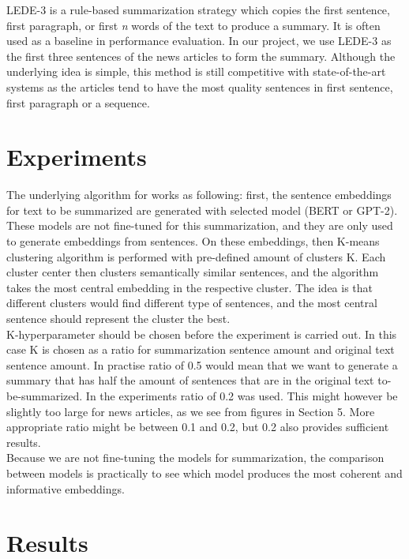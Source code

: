 \documentclass{article}
\begin{document}
LEDE-3 is a rule-based summarization strategy which copies the first sentence, first paragraph, or first \textit{n} words of the text to produce a summary. It is often used as a baseline in performance evaluation. In our project, we use LEDE-3 as the first three sentences of the news articles to form the summary. Although the underlying idea is simple, this method is still competitive with state-of-the-art systems as the articles tend to have the most quality sentences in first sentence, first paragraph or a sequence. \cite{dataset}
\clearpage
\section{Experiments}

The underlying algorithm for \cite{extractive_bert} works as following: first, the sentence embeddings for text to be summarized are generated with selected model (BERT or GPT-2). These models are not fine-tuned for this summarization, and they are only used to generate embeddings from sentences. On these embeddings, then K-means clustering algorithm is performed with pre-defined amount of clusters K. Each cluster center then clusters semantically similar sentences, and the algorithm takes the most central embedding in the respective cluster. The idea is that different clusters would find different type of sentences, and the most central sentence should represent the cluster the best.\\

K-hyperparameter should be chosen before the experiment is carried out. In this case K is chosen as a ratio for summarization sentence amount and original text sentence amount. In practise ratio of 0.5 would mean that we want to generate a summary that has half the amount of sentences that are in the original text to-be-summarized. In the experiments ratio of 0.2 was used. This might however be slightly too large for news articles, as we see from figures in Section 5. More appropriate ratio might be between 0.1 and 0.2, but 0.2 also provides sufficient results. \\

Because we are not fine-tuning the models for summarization, the comparison between models is practically to see which model produces the most coherent and informative embeddings. 

\clearpage
\section{Results}
\end{document}
